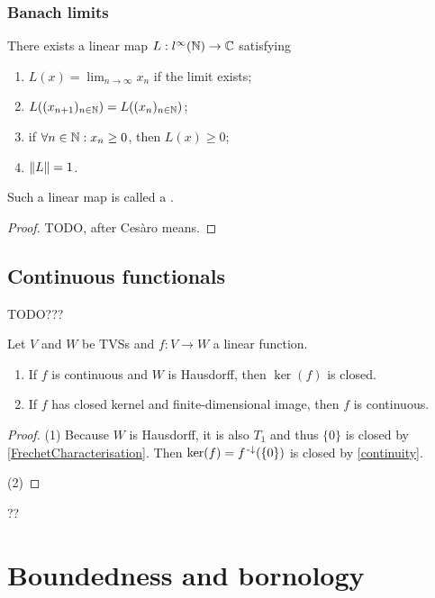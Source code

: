 \subsection{Banach limits}
\begin{proposition}
There exists a linear map $L:l^\infty(\mathbb{N}) \to \mathbb{C}$ satisfying
\begin{enumerate}
\item $\displaystyle L(x) = \lim_{n\to \infty}x_n$ if the limit exists;
\item $L((x_{n+1})_{n\in\mathbb{N}}) = L((x_n)_{n\in\mathbb{N}})$;
\item if $\forall n\in\mathbb{N}:x_n\geq 0$, then $L(x) \geq 0$;
\item $\lVert L\rVert = 1$.
\end{enumerate}
Such a linear map is called a .
\end{proposition}
\begin{proof}
TODO, after Cesàro means.
\end{proof}

\section{Continuous functionals}

TODO???
\begin{proposition}
Let $V$ and $W$ be TVSs and $f: V\to W$ a linear function.
\begin{enumerate}
\item If $f$ is continuous and $W$ is Hausdorff, then $\ker(f)$ is closed.
\item If $f$ has closed kernel and finite-dimensional image, then $f$ is continuous.
\end{enumerate}
\end{proposition}
\begin{proof}
(1) Because $W$ is Hausdorff, it is also $T_1$ and thus $\{0\}$ is closed by \ref{FrechetCharacterisation}. Then $\ker(f) = f^{{\text{\hspace{0.15em}-}\downarrow}}(\{0\})$ is closed by \ref{continuity}.

(2) 
\end{proof}
??

\chapter{Boundedness and bornology}

